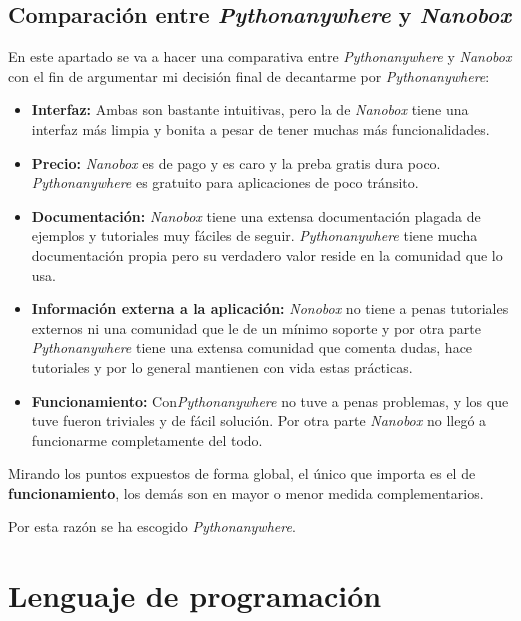 
\subsection{Comparación entre \textit{Pythonanywhere} y \textit{Nanobox}}
En este apartado se va a hacer una comparativa entre \textit{Pythonanywhere} y \textit{Nanobox} con el fin de argumentar mi decisión final de decantarme por \textit{Pythonanywhere}:

\begin{itemize}
	\item \textbf{Interfaz:} Ambas son bastante intuitivas, pero la de \textit{Nanobox} tiene una interfaz más limpia y bonita a pesar de tener muchas más funcionalidades.
	
	\item \textbf{Precio:} \textit{Nanobox} es de pago y es caro y la preba gratis dura poco. \textit{Pythonanywhere} es gratuito para aplicaciones de poco tránsito.
	
	\item \textbf{Documentación:} \textit{Nanobox} tiene una extensa documentación plagada de ejemplos y tutoriales muy fáciles de seguir. \textit{Pythonanywhere} tiene mucha documentación propia pero su verdadero valor reside en la comunidad que lo usa.
	
	\item \textbf{Información externa a la aplicación:} \textit{Nonobox} no tiene a penas tutoriales externos ni una comunidad que le de un mínimo soporte y por otra parte \textit{Pythonanywhere} tiene una extensa comunidad que comenta dudas, hace tutoriales y por lo general mantienen con vida estas prácticas.
	
	\item \textbf{Funcionamiento:} Con\textit{Pythonanywhere} no tuve a penas problemas, y los que tuve fueron triviales y de fácil solución. Por otra parte \textit{Nanobox} no llegó a funcionarme completamente del todo.
	
\end{itemize}

Mirando los puntos expuestos de forma global, el único que importa es el de \textbf{funcionamiento}, los demás son en mayor o menor medida complementarios.

Por esta razón se ha escogido \textit{Pythonanywhere}.


\section{Lenguaje de programación}
